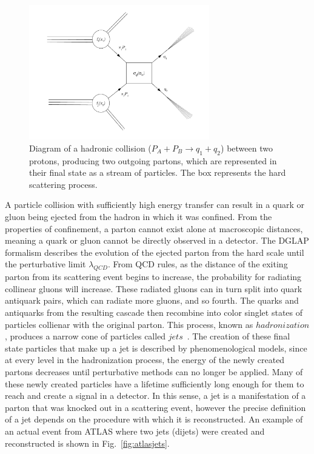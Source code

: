 \begin{figure}
	\centering
	\includegraphics[width=0.7\textwidth]{figures/hadronic_collision.pdf} 
	\caption{ Diagram of a hadronic collision ($P_{A} + P_{B} \rightarrow q_{1} + q_{2}$) between two protons, producing two outgoing partons, which are represented in their final state as a stream of particles. The box represents the hard scattering process.}
	\label{fig:hadroniccollisions}
\end{figure}

A particle collision with sufficiently high energy transfer can result in a quark or gluon being ejected from the hadron in which it was confined. From the properties of confinement, a parton cannot exist alone at macroscopic distances, meaning a quark or gluon cannot be directly observed in a detector. The DGLAP formalism describes the evolution of the ejected parton from the hard scale until the perturbative limit $\lambda_{QCD}$. From QCD rules, as the distance of the exiting parton from its scattering event begins to increase, the probability for radiating collinear gluons will increase. These radiated gluons can in turn split into quark antiquark pairs, which can radiate more gluons, and so fourth. The quarks and antiquarks from the resulting cascade then recombine into color singlet states of particles  collienar with the original parton.  This process, known as $hadronization$, produces a narrow cone of particles called $jets$~\cite{Sterman:1977wj, Webber:1983if, Andersson:1983ia}. The creation of these final state particles that make up a jet is described by phenomenological models, since at every level in the hadronization process, the energy of the newly created partons decreases until perturbative methods can no longer be applied. Many of these newly created particles have a lifetime sufficiently long enough for them to reach and create a signal in a detector. In this sense, a jet is a manifestation of a parton that was knocked out in a scattering event, however the precise definition of a jet depends on the procedure with which it is reconstructed. An example of an actual event from ATLAS where two jets (dijets) were created and reconstructed is shown in Fig.~\ref{fig:atlasjets}.

